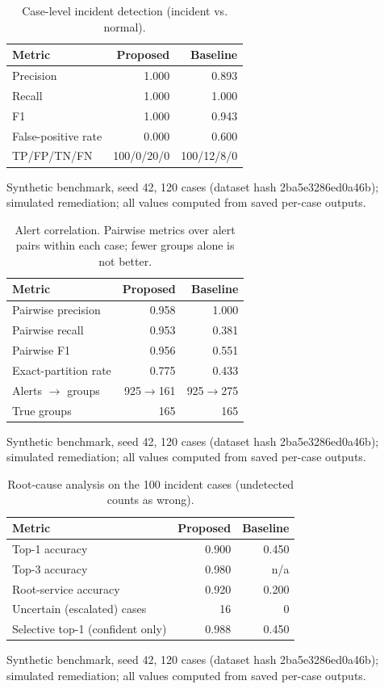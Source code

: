 \begin{table}[t]
\centering
\caption{Case-level incident detection (incident vs. normal).}
\label{tab:detection}
\begin{tabular}{lrr}
\toprule
Metric & Proposed & Baseline \\
\midrule
Precision & 1.000 & 0.893 \\
Recall & 1.000 & 1.000 \\
F1 & 1.000 & 0.943 \\
False-positive rate & 0.000 & 0.600 \\
TP/FP/TN/FN & 100/0/20/0 & 100/12/8/0 \\
\bottomrule
\end{tabular}
\par\footnotesize Synthetic benchmark, seed 42, 120 cases (dataset hash 2ba5e3286ed0a46b); simulated remediation; all values computed from saved per-case outputs.
\end{table}

\begin{table}[t]
\centering
\caption{Alert correlation. Pairwise metrics over alert pairs within each case; fewer groups alone is not better.}
\label{tab:corr}
\begin{tabular}{lrr}
\toprule
Metric & Proposed & Baseline \\
\midrule
Pairwise precision & 0.958 & 1.000 \\
Pairwise recall & 0.953 & 0.381 \\
Pairwise F1 & 0.956 & 0.551 \\
Exact-partition rate & 0.775 & 0.433 \\
Alerts $\to$ groups & 925$\to$161 & 925$\to$275 \\
True groups & 165 & 165 \\
\bottomrule
\end{tabular}
\par\footnotesize Synthetic benchmark, seed 42, 120 cases (dataset hash 2ba5e3286ed0a46b); simulated remediation; all values computed from saved per-case outputs.
\end{table}

\begin{table}[t]
\centering
\caption{Root-cause analysis on the 100 incident cases (undetected counts as wrong).}
\label{tab:rca}
\begin{tabular}{lrr}
\toprule
Metric & Proposed & Baseline \\
\midrule
Top-1 accuracy & 0.900 & 0.450 \\
Top-3 accuracy & 0.980 & n/a \\
Root-service accuracy & 0.920 & 0.200 \\
Uncertain (escalated) cases & 16 & 0 \\
Selective top-1 (confident only) & 0.988 & 0.450 \\
\bottomrule
\end{tabular}
\par\footnotesize Synthetic benchmark, seed 42, 120 cases (dataset hash 2ba5e3286ed0a46b); simulated remediation; all values computed from saved per-case outputs.
\end{table}

